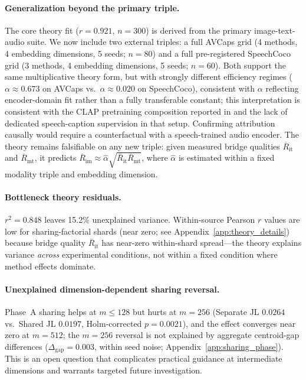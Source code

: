 \documentclass{article}
\newcommand{\avgR}{\overline{R}}
\begin{document}
\paragraph{Generalization beyond the primary triple.}
The core theory fit ($r=0.921$, $n=300$) is derived from the primary image-text-audio suite.
We now include two external triples: a full AVCaps grid (4 methods, 4 embedding dimensions, 5 seeds; $n=80$) and a full pre-registered SpeechCoco grid (3 methods, 4 embedding dimensions, 5 seeds; $n=60$).
Both support the same multiplicative theory form, but with strongly different efficiency regimes ($\alpha\approx0.673$ on AVCaps vs.\ $\alpha\approx0.020$ on SpeechCoco), consistent with $\alpha$ reflecting encoder-domain fit rather than a fully transferable constant; this interpretation is consistent with the CLAP pretraining composition reported in \citet{elizalde2022clap} and the lack of dedicated speech-caption supervision in that setup. Confirming attribution causally would require a counterfactual with a speech-trained audio encoder.
The theory remains falsifiable on any new triple: given measured bridge qualities $\avgR_\mathrm{it}$ and $\avgR_\mathrm{mt}$, it predicts $\avgR_\mathrm{im} \approx \hat{\alpha}\sqrt{\avgR_\mathrm{it}\avgR_\mathrm{mt}}$, where $\hat{\alpha}$ is estimated within a fixed modality triple and embedding dimension.

\paragraph{Bottleneck theory residuals.}
$r^2 = 0.848$ leaves 15.2\% unexplained variance.
Within-source Pearson $r$ values are low for sharing-factorial shards (near zero; see Appendix~\ref{app:theory_details}) because bridge quality $\avgR_\mathrm{it}$ has near-zero within-shard spread---the theory explains variance \emph{across} experimental conditions, not within a fixed condition where method effects dominate.

\paragraph{Unexplained dimension-dependent sharing reversal.}
Phase~A sharing helps at $m\le128$ but hurts at $m=256$ (Separate JL $0.0264$ vs.\ Shared JL $0.0197$, Holm-corrected $p=0.0021$), and the effect converges near zero at $m=512$; the $m=256$ reversal is not explained by aggregate centroid-gap differences ($\Delta_\mathrm{gap}=0.003$, within seed noise; Appendix~\ref{app:sharing_phase}).
This is an open question that complicates practical guidance at intermediate dimensions and warrants targeted future investigation.
\end{document}
